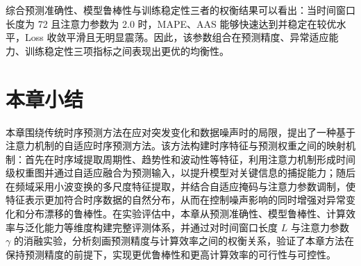 综合预测准确性、模型鲁棒性与训练稳定性三者的权衡结果可以看出：当时间窗口长度为 72 且注意力参数为 2.0 时，MAPE、AAS 能够快速达到并稳定在较优水平，Loss 收敛平滑且无明显震荡。因此，该参数组合在预测精度、异常适应能力、训练稳定性三项指标之间表现出更优的均衡性。

\section{本章小结}\label{ux672cux7ae0ux5c0fux7ed3-1}

本章围绕传统时序预测方法在应对突发变化和数据噪声时的局限，提出了一种基于注意力机制的自适应时序预测方法。该方法构建时序特征与预测权重之间的映射机制：首先在时序域提取周期性、趋势性和波动性等特征，利用注意力机制形成时间级权重图并通过自适应融合为预测输入，以提升模型对关键信息的捕捉能力；随后在频域采用小波变换的多尺度特征提取，并结合自适应掩码与注意力参数调制，使特征表示更加符合时序数据的自然分布，从而在控制噪声影响的同时增强对异常变化和分布漂移的鲁棒性。在实验评估中，本章从预测准确性、模型鲁棒性、计算效率与泛化能力等维度构建完整评测体系，并通过对时间窗口长度 \(L\) 与注意力参数 \(\gamma\) 的消融实验，分析刻画预测精度与计算效率之间的权衡关系，验证了本章方法在保持预测精度的前提下，实现更优鲁棒性和更高计算效率的可行性与可控性。

